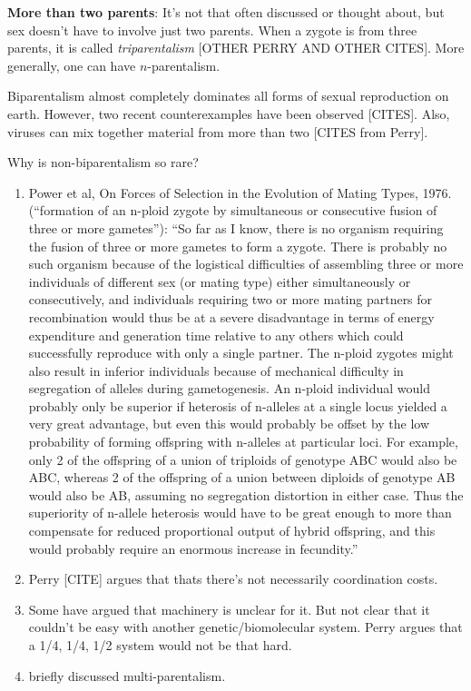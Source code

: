 \begin{enumerate}
\textbf{More than two parents}: It's not that often discussed or thought about, but sex doesn't have to involve just two parents.  When a zygote is from three parents, it is called \emph{triparentalism}  [OTHER PERRY AND OTHER CITES].  More generally, one can have $n$-parentalism.

Biparentalism almost completely dominates all forms of sexual reproduction on earth.  However, two recent counterexamples have been observed [CITES].  Also, viruses can mix together material from more than two [CITES from Perry].  


Why is non-biparentalism so rare?
\begin{enumerate}
\item Power et al, On Forces of Selection in the Evolution of Mating Types, 1976.~\cite{power_forces_1976} (``formation of an n-ploid zygote by simultaneous or consecutive fusion of three or more gametes''): ``So far as I know, there is no organism requiring the fusion of three or more gametes to form a zygote. There is probably no such organism because of the logistical difficulties of assembling three or more individuals of different sex (or mating type) either simultaneously or consecutively, and individuals requiring two or more mating partners for recombination would thus be at a severe disadvantage in terms of energy expenditure and generation time relative to any others which could successfully reproduce with only a single partner. The n-ploid zygotes might also result in inferior individuals because of mechanical difficulty in segregation of alleles during gametogenesis. An n-ploid individual would probably only be superior if heterosis of n-alleles at a single locus yielded a very great advantage, but even this would probably be offset by the low probability of forming offspring with n-alleles at particular loci. For example, only 2 of the offspring of a union of triploids of genotype ABC would also be ABC, whereas 2 of the offspring of a union between diploids of genotype AB would also be AB, assuming no segregation distortion in either case. Thus the superiority of n-allele heterosis would have to be great enough to more than compensate for reduced proportional output of hybrid offspring, and this would probably require an enormous increase in fecundity.''
\item Perry [CITE] argues that thats there's not necessarily coordination costs.
\item Some have argued that machinery is unclear for it. But not clear that it couldn't be easy with another genetic/biomolecular system.  Perry argues that a 1/4, 1/4, 1/2 system would not be that hard.
\item \cite{hurst_why_1996} briefly discussed multi-parentalism.
\end{enumerate}


\end{enumerate}
